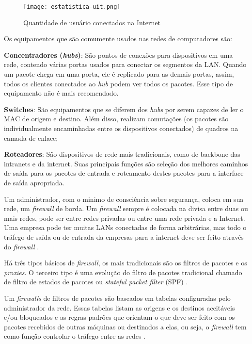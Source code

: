 \begin{figure}[htb]
    \centering
    \caption{Quantidade de usuário conectados na Internet} 
    \texttt{[image: estatistica-uit.png]}
    \label{fig:estatisca-itu}
\end{figure}

Os equipamentos que são comumente usados nas redes de computadores são:

\begin{alineas}
\item \textbf{Concentradores (\textit{hubs})}: São pontos de conexões para dispositivos em uma rede, contendo várias portas usados para conectar os segmentos da LAN. Quando um pacote chega em uma porta, ele é replicado para as demais portas, assim, todos os clientes conectados ao \textit{hub} podem ver todos os pacotes. Esse tipo de equipamento não é mais recomendado.
\item \textbf{Switches}: São equipamentos que se diferem dos \textit{hubs} por serem capazes de ler o MAC de origem e destino. Além disso, realizam comutações (os pacotes são individualmente encaminhadas entre os dispositivos conectados) de quadros na camada de enlace;
\item \textbf{Roteadores}: São dispositivos de rede mais tradicionais, como de backbone das intranets e da internet. Suas principais funções são seleção dos melhores caminhos de saída para os pacotes de entrada e roteamento destes pacotes para a interface de saída apropriada.
\end{alineas}

Um administrador, com o minimo de consciência sobre segurança, coloca em sua rede, um \textit{firewall} de borda. Um \textit{firewall} sempre é colocada na divisa entre duas ou mais redes, pode ser entre redes privadas ou entre uma rede privada e a Internet. Uma empresa pode ter muitas LANs conectadas de forma arbitrárias, mas todo o tráfego de saída ou de entrada da empresas para a internet deve ser feito através do \textit{firewall} \cite{redesdecomputadores}.

Há três tipos básicos de \textit{firewall}, os mais tradicionais são os filtros de pacotes e os \textit{proxies}. O terceiro tipo é uma evolução do filtro de pacotes tradicional chamado de filtro de estados de pacotes ou \textit{stateful packet filter} (SPF) \cite{univhacker}.

Um \textit{firewalls} de filtros de pacotes são baseados em tabelas configuradas pelo administrador da rede. Essas tabelas listam as origens e os destinos aceitáveis e/ou bloqueados e as regras padrões que orientam o que deve ser feito com os pacotes recebidos de outras máquinas ou destinados a elas, ou seja, o \textit{firewall} tem como função controlar o tráfego entre as redes \cite{redesdecomputadores}. 

